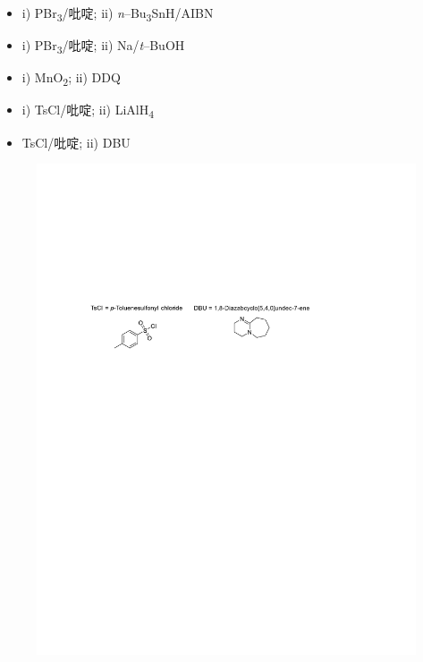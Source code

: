 \renewcommand{\labelitemi}{$\square$}
\begin{itemize}
	\item i) PBr\textsubscript{3}/吡啶; ii)  \textit{n}--Bu\textsubscript{3}SnH/AIBN
	\item i) PBr\textsubscript{3}/吡啶; ii) Na/\emph{t}--BuOH
	\item i) MnO\textsubscript{2}; ii) DDQ
	\item i) TsCl/吡啶; ii) LiAlH\textsubscript{4}
	\item TsCl/吡啶; ii) DBU
\end{itemize}
\renewcommand{\labelitemi}{$\bullet$}

\begin{figure}[h]
	\centering
	\includegraphics[width=12cm]{./pic/t1-5.pdf}
\end{figure}

